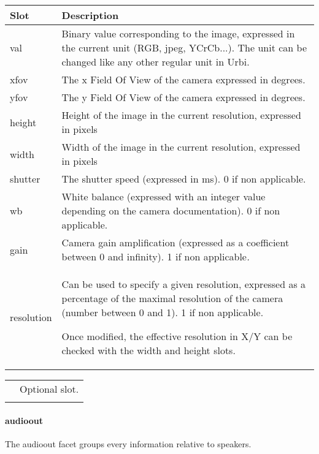 \documentclass[a4paper]{article}
\begin{document}
\begin{flushleft}
\tablehead{}
\begin{supertabular}{|m{3.293cm}|m{11.997cm}|}
\hline
\sffamily\bfseries Slot &
\sffamily\bfseries Description\\\hline
val &
\sffamily Binary value corresponding to the
image, expressed in the current unit (RGB, jpeg, YCrCb...). The unit
can be changed like any other regular unit in Urbi. \\\hline
xfov &
\sffamily The x Field Of View of the camera
expressed in degrees.\\\hline
yfov &
\sffamily The y Field Of View of the camera
expressed in degrees.\\\hline
height &
\sffamily Height of the image in the current
resolution, expressed in pixels\\\hline
width &
\sffamily Width of the image in the current
resolution, expressed in pixels\\\hline
shutter &
\textsf{The shutter speed }\textsf{(expressed
in ms). 0 if non applicable.}\\\hline
wb &
\textsf{White balance }\textsf{(expressed with
an integer value depending on the camera documentation). 0 if non
applicable.}\\\hline
gain &
\textsf{Camera gain amplification
}\textsf{(expressed as a coefficient between 0 and infinity). 1 if non
applicable}\textsf{\textit{.}}\\\hline
resolution &
{\sffamily Can be used to specify a given
resolution, expressed as a percentage of the maximal resolution of the
camera (number between 0 and 1). 1 if non applicable. }

\sffamily Once modified, the effective
resolution in X/Y can be checked with the width and height
slots.\\\hline
\end{supertabular}
\end{flushleft}
\begin{flushleft}
\tablehead{}
\begin{supertabular}{|m{1.717cm}|m{10.464cm}}
\hhline{-~}
 &
Optional slot.\\\hhline{-~}
\end{supertabular}
\end{flushleft}
\paragraph{audioout}

{\sffamily
The audioout facet groups every information relative to speakers. }
\end{document}
